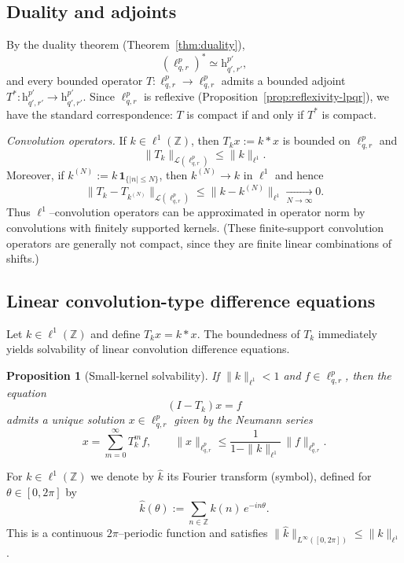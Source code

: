 \documentclass[preprint,12pt]{elsarticle}
\newtheorem{proposition}[theorem]{Proposition}
\begin{document}
\subsection{Duality and adjoints}

By the duality theorem (Theorem~\ref{thm:duality}),
\[
(\ell^{p}_{q,r})^* \simeq \mathrm{h}^{p'}_{q',r'},
\]
and every bounded operator $T:\ell^{p}_{q,r}\to\ell^{p}_{q,r}$ admits a bounded adjoint
$T^*:\mathrm{h}^{p'}_{q',r'}\to \mathrm{h}^{p'}_{q',r'}$.
Since $\ell^{p}_{q,r}$ is reflexive (Proposition~\ref{prop:reflexivity-lpqr}), we have the standard correspondence:
$T$ is compact if and only if $T^*$ is compact.

\medskip
\noindent\textit{Convolution operators.}
If $k\in \ell^1(\mathbb Z)$, then $T_kx:=k*x$ is bounded on $\ell^{p}_{q,r}$ and
\[
\|T_k\|_{\mathcal L(\ell^{p}_{q,r})}\le \|k\|_{\ell^1}.
\]
Moreover, if $k^{(N)}:=k\,\mathbf 1_{\{|n|\le N\}}$, then $k^{(N)}\to k$ in $\ell^1$ and hence
\[
\|T_k-T_{k^{(N)}}\|_{\mathcal L(\ell^{p}_{q,r})}\le \|k-k^{(N)}\|_{\ell^1}\xrightarrow[N\to\infty]{}0.
\]
Thus $\ell^1$--convolution operators can be approximated in operator norm by convolutions with finitely supported kernels.
(These finite-support convolution operators are generally not compact, since they are finite linear combinations of shifts.)


\subsection{Linear convolution-type difference equations}

Let $k\in\ell^1(\mathbb Z)$ and define $T_kx=k*x$.  
The boundedness of $T_k$ immediately yields solvability of linear convolution 
difference equations.

\begin{proposition}[Small-kernel solvability]
\label{prop:small_kernel}
If $\|k\|_{\ell^1}<1$ and $f\in\ell^{p}_{q,r}$, then the equation
\[
(I-T_k)x=f
\]
admits a unique solution $x\in\ell^{p}_{q,r}$ given by the Neumann series
\[
x=\sum_{m=0}^\infty T_k^m f,
\qquad
\|x\|_{\ell^{p}_{q,r}}\le \frac{1}{1-\|k\|_{\ell^1}}\,\|f\|_{\ell^{p}_{q,r}}.
\]
\end{proposition}
For $k\in \ell^{1}(\mathbb Z)$ we denote by $\widehat{k}$ its Fourier transform (symbol),
defined for $\theta\in[0,2\pi]$ by
\[
\widehat{k}(\theta):=\sum_{n\in\mathbb Z} k(n)\,e^{-in\theta}.
\]
This is a continuous $2\pi$--periodic function and satisfies
$\|\widehat{k}\|_{L^\infty([0,2\pi])}\le \|k\|_{\ell^{1}}$.
\end{document}

